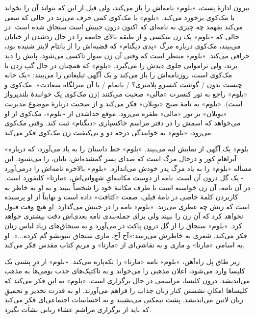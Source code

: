 \documentclass[12pt]{book}
\newcommand{\noun}[1]{«{#1}»}
\begin{document}
    بیرون ادارۀ پست، \noun{بلوم} نامه‌اش را باز می‌کند، ولی قبل از این که بتواند آن را بخواند با مک‌کوی برخورد می‌کند. \noun{بلوم} با مک‌کوی کمی حرف می‌زند در حالی که سعی می‌کند بفهمد چه چیزی به نامه‌ای که اکنون درون جیبش است سنجاق شده است. در حالی که \noun{بلوم} یک زن سکسی و از طبقه بالای جامعه را در حال ردشدن از خیابان می‌بیند، مک‌کوی درباره مرگ \noun{پدی دیگنام} که قضیه‌اش را از بانتام لاینز شنیده بود، حرافی می‌کند. \noun{بلوم} منتظر است که وقتی آن زن سوار تاکسی می‌شود، پایش را دید بزند، ولی تراموایی جلوی دیدش را می‌گیرد. \noun{بلوم} که همچنان در حال گپ زدن با مک‌کوی است، روزنامه‌اش را باز می‌کند و یک آگهی تبلیغاتی را می‌بیند: «یک خانه چیست بدون / گوشت کنسرو پلامتری؟ / ناتمام / با آن منزلگاه سعادت». مک‌کوی و \noun{بلوم} راجع به تور کنسرت \noun{مالی} صحبت می‌کنند (زن مک‌کوی یک خوانندۀ بلندپرواز است). \noun{بلوم} به نامۀ صبح \noun{بویلان} فکر می‌کند و از صحبت دربارۀ موضوع مدیریت \noun{بویلان} بر تور \noun{مالی} طفره می‌رود. موقع جداشدن از \noun{بلوم}، مک‌کوی از او می‌خواهد که اسمش را در دفتر مراسم خاکسپاری \noun{دیگنام} ثبت کند. وقتی مک‌کوی می‌رود، \noun{بلوم} به خوانندگی درجه دو و بی‌کیفیت زن مک‌کوی فکر می‌کند.

    \noun{بلوم} یک آگهی از نمایش لیه می‌بیند. \noun{بلوم} خط داستان را به یاد می‌آورد، که درباره آبراهامِ کور و درحال مرگ است که صدای پسر گمشده‌اش، ناتان، را می‌شنود. این مسأله \noun{بلوم} را به یاد مرگ پدر خودش می‌اندازد. \noun{بلوم} بالاخره نامه‌اش را درمی‌آورد - یک گل درون آن است. نامه از دوست مکاتبه‌ایِ شهوانی‌اش، \noun{مارتا} کلیفورد است. در آن نامه، آن زن خواسته است تا طرف مکاتبۀ خود را شخصاً ببیند و به او به خاطر به کاربردن کلمۀ خاصی در نامۀ قبلی، صفت «کثافت» داده است و نهایتاً از او پرسیده است که زنش چه عطری می‌زند. \noun{بلوم} نامه را در جیبش می‌گذارد. او هیچ وقت قبول نخواهد کرد که آن زن را ببیند ولی برای جمله‌بندی نامه بعدی‌اش دقت بیشتری خواهد کرد. \noun{بلوم} سنجاق را از گل درون پاکت در می‌آورد و به سنجاق‌های زیاد لباس زنان فکر می‌کند. شعری به خاطرش می‌رسد:«آخ آخ، ماری سنجاق تنبونشو گم کرده...». او به اسامی \noun{مارتا} و ماری و به نقاشی‌ای از \noun{مارتا} و مریمِ کتاب مقدس فکر می‌کند.

    زیر طاق پل راه‌آهن، \noun{بلوم} نامه \noun{مارتا} را تکه‌پاره می‌کند. \noun{بلوم} از درِ پشتی یک کلیسا وارد می‌شود، اعلان مذهبی را می‌خواند و به تاکتیک‌های جذب بومی‌ها به مذهب می‌اندیشد. درون کلیسا، مراسمی در حال برگزاری است. \noun{بلوم} به این فکر می‌کند که کلیساها امکانِ نشستن کنار زنان جذاب را فراهم می‌آورند. او به قدرت تخدیر و تحمیقِ زبان لاتین می‌اندیشد. پشت نیمکتی می‌نشیند و به احساسات اجتماعی‌ای فکر می‌کند که باید از برگزاری مراشم عشاء ربانی نشأت بگیرد.
\end{document}
